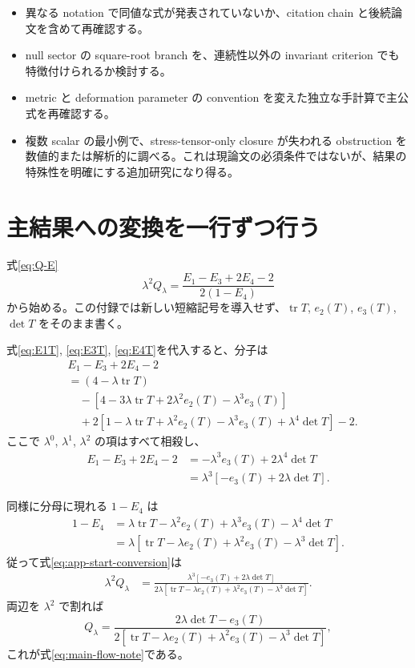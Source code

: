 \documentclass[a4paper,11pt]{ltjsreport}
\newcommand{\tr}{\operatorname{tr}}
\begin{document}
\begin{itemize}
 \item 異なる notation で同値な式が発表されていないか、citation chain と後続論文を含めて再確認する。
 \item null sector の square-root branch を、連続性以外の invariant criterion でも特徴付けられるか検討する。
 \item metric と deformation parameter の convention を変えた独立な手計算で主公式を再確認する。
 \item 複数 scalar の最小例で、stress-tensor-only closure が失われる obstruction を数値的または解析的に調べる。これは現論文の必須条件ではないが、結果の特殊性を明確にする追加研究になり得る。
\end{itemize}

\appendix

\chapter{主結果への変換を一行ずつ行う}
\label{app:conversion}

式\eqref{eq:Q-E}
\begin{equation}
 \lambda^2Q_\lambda
 =\frac{E_1-E_3+2E_4-2}{2(1-E_4)}
 \label{eq:app-start-conversion}
\end{equation}
から始める。この付録では新しい短縮記号を導入せず、$\tr T$, $e_2(T)$, $e_3(T)$, $\det T$ をそのまま書く。

式\eqref{eq:E1T}, \eqref{eq:E3T}, \eqref{eq:E4T}を代入すると、分子は
\begin{align}
 &E_1-E_3+2E_4-2\nonumber\\
 &=(4-\lambda\tr T)\nonumber\\
 &\quad-\left[4-3\lambda\tr T+2\lambda^2e_2(T)-\lambda^3e_3(T)\right]\nonumber\\
 &\quad+2\left[1-\lambda\tr T+\lambda^2e_2(T)
 -\lambda^3e_3(T)+\lambda^4\det T\right]-2.
 \label{eq:app-numerator-expanded}
\end{align}
ここで $\lambda^0$, $\lambda^1$, $\lambda^2$ の項はすべて相殺し、
\begin{align}
 E_1-E_3+2E_4-2
 &=-\lambda^3e_3(T)+2\lambda^4\det T\\
 &=\lambda^3\left[-e_3(T)+2\lambda\det T\right].
 \label{eq:N-conversion}
\end{align}

同様に分母に現れる $1-E_4$ は
\begin{align}
 1-E_4
 &=\lambda\tr T-\lambda^2e_2(T)+\lambda^3e_3(T)-\lambda^4\det T\\
 &=\lambda\left[\tr T-\lambda e_2(T)+\lambda^2e_3(T)-\lambda^3\det T\right].
 \label{eq:D-conversion}
\end{align}
従って式\eqref{eq:app-start-conversion}は
\begin{align}
 \lambda^2Q_\lambda
 &=\frac{\lambda^3[-e_3(T)+2\lambda\det T]}
 {2\lambda[\tr T-\lambda e_2(T)+\lambda^2e_3(T)-\lambda^3\det T]}.
\end{align}
両辺を $\lambda^2$ で割れば
\begin{equation}
 Q_\lambda
 =\frac{2\lambda\det T-e_3(T)}
 {2[\tr T-\lambda e_2(T)+\lambda^2e_3(T)-\lambda^3\det T]},
\end{equation}
これが式\eqref{eq:main-flow-note}である。
\end{document}

